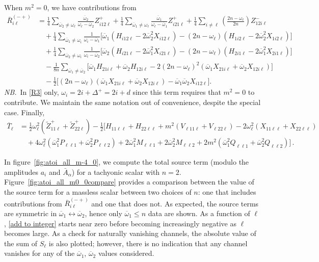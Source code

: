 \documentclass[letterpaper,11pt]{article}
\newcommand{\oi}{\omega_i}
\newcommand{\ol}{\omega_\ell}
\newcommand{\oone}{\overline{\omega}_1}
\newcommand{\otwo}{\overline{\omega}_2}
\begin{document}
When $m^2 = 0$, we have contributions from
\begin{align}
\label{R3}
\overline{R}_{i\ell}^{(-+)} &=  \frac{1}{4} \sum_{\otwo \neq \ol} \frac{\otwo}{\ol - \otwo} Z^+_{i12\ell} + \frac{1}{4} \sum_{\oone \neq \ol} \frac{\oone}{\ol - \oone} Z^+_{i21\ell} + \frac{1}{4} \sum_{i \neq \ell} \left( \frac{2n - \ol}{2n} \right) Z^-_{12i\ell} \nonumber \\
%
& \quad + \frac{1}{4} \sum_{\oone \neq \oi} \frac{1}{\oi - \oone} \Big[ \oone \left( H_{i12\ell} - 2\otwo^2 X_{i12\ell} \right) - (2n - \ol) \left( H_{1i2\ell} - 2\otwo^2 X_{1i2\ell} \right) \Big] \nonumber \\
%
& \quad + \frac{1}{4} \sum_{\otwo \neq \oi} \frac{1}{\oi - \otwo} \Big[ \otwo \left( H_{i21\ell} - 2\oone^2 X_{i21\ell} \right) - (2n - \ol) \left( H_{2i1\ell} - 2\oone^2 X_{2i1\ell} \right) \Big] \nonumber \\
%
& \quad - \frac{1}{8n} \sum_{\oone \neq \otwo} \Big[ \oone H_{21i\ell} + \otwo H_{12i\ell} - 2 \left( 2n - \ol \right)^2 \left(\oone X_{21i\ell} + \otwo X_{12i\ell} \right) \Big] \nonumber \\
%
& \quad - \frac{1}{2} \Big[ (2n - \ol) \left( \oone X_{21i\ell} + \otwo X_{12i\ell} \right) - \oone \otwo X_{i12\ell} \Big] .
\end{align}
{\it NB.}\, In \eqref{R3} only, $\oi = 2i + \Delta^+ = 2i + d$ since this term requires that $m^2 = 0$ to contribute. We maintain the same notation out of convenience, despite the special case. Finally, 
\begin{align}
\label{T12}
\overline{T}_{\ell} &=  \frac{1}{2} \ol^2 \left( \tilde{Z}^+_{11\ell} + \tilde{Z}^+_{22\ell} \right)- \frac{1}{2} \Big[ H_{11\ell\ell} + H_{22\ell\ell} + m^2 \left( V_{\ell 1 1 \ell} + V_{\ell 2 2 \ell} \right) - 2 \ol^2 \left( X_{11\ell\ell} + X_{22\ell\ell} \right)  \nonumber \\
%
& \quad + 4 \ol^2 \left( \oone^2 P_{\ell \ell 1} + \otwo^2 P_{\ell \ell 2} \right) + 2\oone^2 M_{\ell \ell 1} + 2\otwo^2 M_{\ell \ell 2} + 2m^2 \left( \oone^2 Q_{\ell\ell 1} + \otwo^2 Q_{\ell \ell 2} \right) \Big] \, .
\end{align}

In figure~\ref{fig:atoi_all_m-4_0}, we compute the total source term (modulo the amplitudes $a_i$ and $\bar A_\alpha$) for a tachyonic scalar with $n = 2$. Figure~\ref{fig:atoi_all_m0_0compare} provides a comparison between the value of the source term for a massless scalar between two choices of $n$: one that includes contributions from $\overline{R}_{i\ell}^{(-+)}$ and one that does not. As expected, the source terms are symmetric in $\oone \leftrightarrow \otwo$, hence only $\oone \leq n$ data are shown. As a function of $\ell$, \eqref{add to integer} starts near zero before becoming increasingly negative as $\ell$ becomes large. As a check for naturally vanishing channels, the absolute value of the sum of $S_\ell$ is also plotted; however, there is no indication that any channel vanishes for any of the $\oone$, $\otwo$ values considered. 
\end{document}
